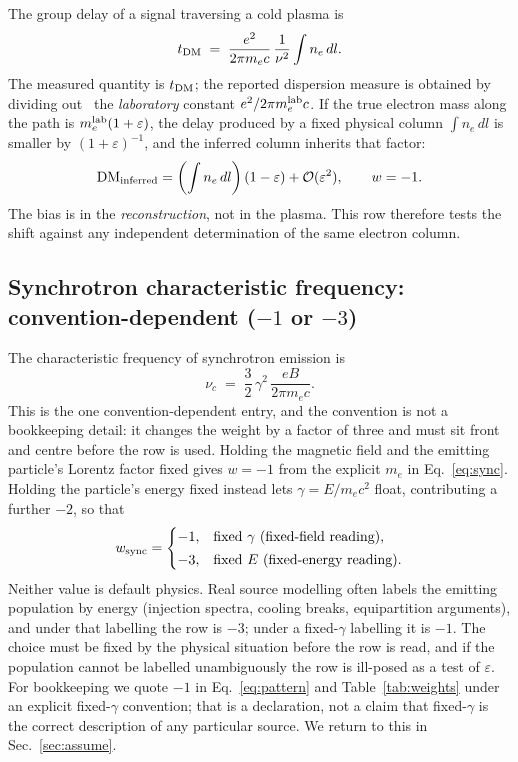 \documentclass[aps,prd,twocolumn,superscriptaddress,nofootinbib,10pt]{revtex4-2}
\begin{document}
The group delay of a signal traversing a cold plasma is~\cite{LorimerKramer2004}
%
\begin{equation}
  t_{\rm DM} \;=\; \frac{e^{2}}{2\pi m_e c}\,\frac{1}{\nu^{2}} \int n_e \, dl .
  \label{eq:dm}
\end{equation}
%
The measured quantity is $t_{\rm DM}$; the reported dispersion measure is obtained by dividing
out~\cite{Kulkarni2020}
the \emph{laboratory} constant $e^{2}/2\pi m_e^{\rm lab}c$. If the true electron mass along the path
is $m_e^{\rm lab}(1+\varepsilon)$, the delay produced by a fixed physical column
$\int n_e\,dl$ is smaller by $(1+\varepsilon)^{-1}$, and the inferred column inherits that factor:
%
\begin{equation}
  \mathrm{DM}_{\rm inferred} = \left(\int n_e\,dl\right)(1-\varepsilon) + \mathcal{O}(\varepsilon^2),
  \qquad w = -1 .
\end{equation}
%
The bias is in the \emph{reconstruction}, not in the plasma. This row therefore tests the shift
against any independent determination of the same electron column.

\subsection{Synchrotron characteristic frequency: convention-dependent ($-1$ or $-3$)}

The characteristic frequency of synchrotron emission is~\cite{RybickiLightman1979}
%
\begin{equation}
  \nu_c \;=\; \frac{3}{2}\,\gamma^{2}\,\frac{eB}{2\pi m_e c}.
  \label{eq:sync}
\end{equation}
%
This is the one convention-dependent entry, and the convention is not a bookkeeping detail: it
changes the weight by a factor of three and must sit front and centre before the row is used.
Holding the magnetic field and the emitting particle's Lorentz factor fixed gives $w = -1$ from the
explicit $m_e$ in Eq.~\eqref{eq:sync}. Holding the particle's energy fixed instead lets
$\gamma = E/m_e c^{2}$ float, contributing a further $-2$, so that
%
\begin{equation}
  w_{\rm sync} = \begin{cases}
    -1, & \text{fixed } \gamma \text{ (fixed-field reading)},\\[2pt]
    -3, & \text{fixed } E \text{ (fixed-energy reading)}.
  \end{cases}
\end{equation}
%
Neither value is default physics. Real source modelling often labels the emitting population by
energy (injection spectra, cooling breaks, equipartition arguments), and under that labelling the
row is $-3$; under a fixed-$\gamma$ labelling it is $-1$. The choice must be fixed by the physical
situation before the row is read, and if the population cannot be labelled unambiguously the row is
ill-posed as a test of $\varepsilon$. For bookkeeping we quote $-1$ in Eq.~\eqref{eq:pattern} and
Table~\ref{tab:weights} under an explicit fixed-$\gamma$ convention; that is a declaration, not a
claim that fixed-$\gamma$ is the correct description of any particular source. We return to this in
Sec.~\ref{sec:assume}.
\end{document}
